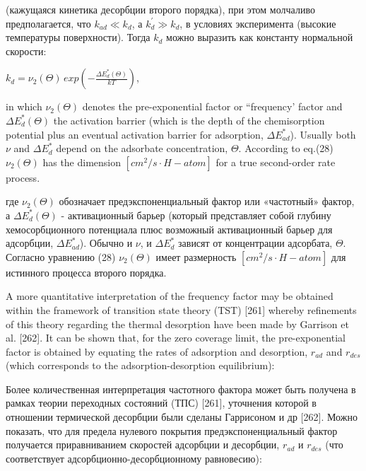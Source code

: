 \documentclass[11pt]{article}
\begin{document}
    (кажущаяся кинетика десорбции второго порядка), при этом молчаливо
предполагается, что \(k_{ad} \ll k_d\), а \(k_{d}^{\prime} \gg k_d\), в
условиях эксперимента (высокие температуры поверхности). Тогда \(k_d\)
можно выразить как константу нормальной скорости:

    \(k_d = \nu_2 \left(\Theta\right) \, exp \left(-\frac{\Delta E^{*}_{d}\left(\Theta\right)}{kT} \right)\),

    in which \(\nu_2 \left(\Theta\right)\) denotes the pre-exponential
factor or ``frequency' factor and
\(\Delta E^{*}_{d}\left(\Theta\right)\) the activation barrier (which is
the depth of the chemisorption potential plus an eventual activation
barrier for adsorption, \(\Delta E^{*}_{ad}\)). Usually both \(\nu\) and
\(\Delta E^{*}_{d}\) depend on the adsorbate concentration, \(\Theta\).
According to eq.(28) \(\nu_2 \left(\Theta\right)\) has the dimension
\([cm^2/s \cdot H-atom]\) for a true second-order rate process.

    где \(\nu_2 \left(\Theta\right)\) обозначает предэкспоненциальный фактор
или «частотный» фактор, а \(\Delta E^{*}_{d}\left(\Theta\right)\) -
активационный барьер (который представляет собой глубину
хемосорбционного потенциала плюс возможный активационный барьер для
адсорбции, \(\Delta E^{*}_{ad}\)). Обычно и \(\nu\), и
\(\Delta E^{*}_{d}\) зависят от концентрации адсорбата, \(\Theta\).
Согласно уравнению (28) \(\nu_2 \left(\Theta\right)\) имеет размерность
\([cm^2/s \cdot H-atom]\) для истинного процесса второго порядка.

    A more quantitative interpretation of the frequency factor may be
obtained within the framework of transition state theory (TST) {[}261{]}
whereby refinements of this theory regarding the thermal desorption have
been made by Garrison et al. {[}262{]}. It can be shown that, for the
zero coverage limit, the pre-exponential factor is obtained by equating
the rates of adsorption and desorption, \(r_{ad}\) and \(r_{des}\)
(which corresponds to the adsorption-desorption equilibrium):

    Более количественная интерпретация частотного фактора может быть
получена в рамках теории переходных состояний (ТПС) {[}261{]}, уточнения
которой в отношении термической десорбции были сделаны Гаррисоном и др
{[}262{]}. Можно показать, что для предела нулевого покрытия
предэкспоненциальный фактор получается приравниванием скоростей
адсорбции и десорбции, \(r_{ad}\) и \(r_{des}\) (что соответствует
адсорбционно-десорбционному равновесию):
\end{document}
